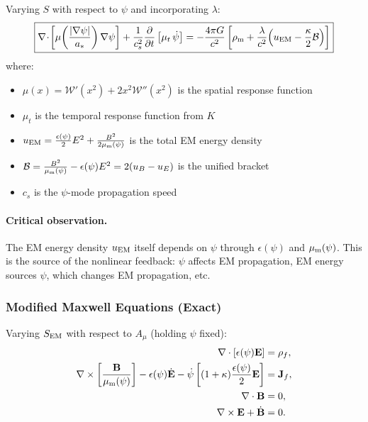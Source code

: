 \documentclass[aps,prd,twocolumn,superscriptaddress,floatfix,nofootinbib]{revtex4-2}
\newcommand{\astar}{a_*}
\newcommand{\Wfunc}{\mathcal{W}}
\newcommand{\mufunction}{\mu}
\newcommand{\lam}{\lambda}
\newcommand{\kap}{\kappa}
\newcommand{\calB}{\mathcal{B}}
\begin{document}
Varying $S$ with respect to $\psi$ and incorporating $\lambda$:
\begin{equation}
\boxed{
\nabla\!\cdot\!\left[\mufunction\!\left(\frac{|\nabla\psi|}{\astar}\right)
\nabla\psi\right]
+ \frac{1}{c_s^2}\frac{\partial}{\partial t}
\left[\mufunction_t\,\dot\psi\right]
= -\frac{4\pi G}{c^2}\left[
  \rho_{\rm m}
  + \frac{\lam}{c^2}\!\left(u_{\rm EM} - \frac{\kap}{2}\calB\right)
\right]
}
\label{eq:psi-field-exact}
\end{equation}
where:
\begin{itemize}[nosep]
\item $\mufunction(x) = \Wfunc'(x^2) + 2x^2\Wfunc''(x^2)$ is the spatial response function
\item $\mufunction_t$ is the temporal response function from $K$
\item $u_{\rm EM} = \frac{\epsilon(\psi)}{2}E^2 + \frac{B^2}{2\mu_{\rm m}(\psi)}$ is the total EM energy density
\item $\calB = \frac{B^2}{\mu_{\rm m}(\psi)} - \epsilon(\psi)E^2 = 2(u_B - u_E)$ is the unified bracket
\item $c_s$ is the $\psi$-mode propagation speed
\end{itemize}

\paragraph{Critical observation.} The EM energy density $u_{\rm EM}$
itself depends on $\psi$ through $\epsilon(\psi)$ and $\mu_{\rm m}(\psi)$.
This is the source of the nonlinear feedback: $\psi$ affects EM
propagation, EM energy sources $\psi$, which changes EM propagation,
etc.

\subsubsection{Modified Maxwell Equations (Exact)}

Varying $S_{\rm EM}$ with respect to $A_\mu$ (holding $\psi$ fixed):
\begin{align}
\nabla\cdot\left[\epsilon(\psi)\mathbf{E}\right] &= \rho_f,
\label{eq:gauss}\\
\nabla\times\left[\frac{\mathbf{B}}{\mu_{\rm m}(\psi)}\right]
- \epsilon(\psi)\dot{\mathbf{E}}
- \dot\psi\left[(1+\kap)\frac{\epsilon(\psi)}{2}\mathbf{E}\right]
&= \mathbf{J}_f,
\label{eq:ampere-exact}\\
\nabla\cdot\mathbf{B} &= 0, \label{eq:divB}\\
\nabla\times\mathbf{E} + \dot{\mathbf{B}} &= 0. \label{eq:faraday}
\end{align}
\end{document}
